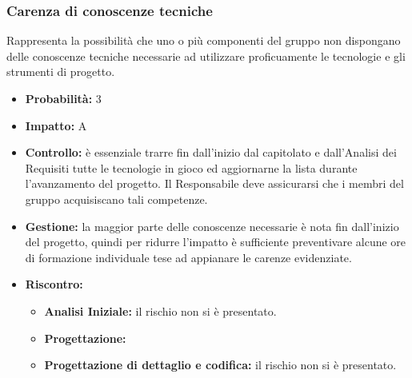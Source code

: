 \documentclass[a4paper,11pt]{article}
\begin{document}
		\subsubsection{Carenza di conoscenze tecniche}
		Rappresenta la possibilità che uno o più componenti del gruppo non dispongano delle conoscenze tecniche necessarie ad utilizzare proficuamente le tecnologie e gli strumenti di progetto.
		\begin{itemize}
		\item \textbf{Probabilità: }3
		\item \textbf{Impatto: }A
		\item \textbf{Controllo:} è essenziale trarre fin dall'inizio dal capitolato e dall'Analisi dei Requisiti tutte le tecnologie in gioco ed aggiornarne la lista durante l'avanzamento del progetto. Il Responsabile deve assicurarsi che i membri del gruppo acquisiscano tali competenze.
		\item \textbf{Gestione:} la maggior parte delle conoscenze necessarie è nota fin dall'inizio del progetto, quindi per ridurre l'impatto è sufficiente preventivare alcune ore di formazione individuale tese ad appianare le carenze evidenziate.
		\item \textbf{Riscontro:}
			\begin{itemize}
				\item\textbf{Analisi Iniziale:} il rischio non si è presentato.
				\item\textbf{Progettazione:}
				\item\textbf{Progettazione di dettaglio e codifica:} il rischio non si è presentato.
			\end{itemize}
		\end{itemize}
\end{document}
